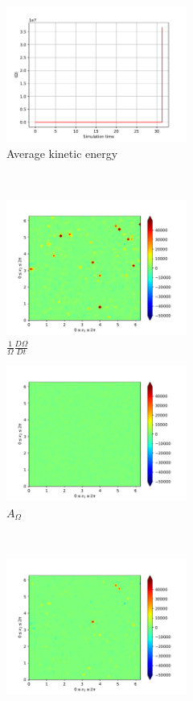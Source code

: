 \begin{figure}[H]
    \begin{subfigure}[H]{0.45\textwidth}
        \includegraphics[height=1.75in]{media/run-cds-65-25k/enst-average2449}
        \caption{Average kinetic energy}
    \end{subfigure}
    ~
    \begin{subfigure}[H]{0.45\textwidth}
        \includegraphics[height=1.75in]{media/run-cds-65-25k/enst-2449}
        \caption{$\frac{1}{\Omega} \frac{D \Omega}{Dt}$}
    \end{subfigure}
    \newline
    \begin{subfigure}{0.45\textwidth}
        \includegraphics[height=1.75in]{media/run-cds-65-25k/A-enst-449}
        \caption{$A_{\Omega}$}
    \end{subfigure}
    ~
    \begin{subfigure}{0.45\textwidth}
        \includegraphics[height=1.75in]{media/run-cds-65-25k/Pi-enst-449}

\end{subfigure}
\end{figure}

